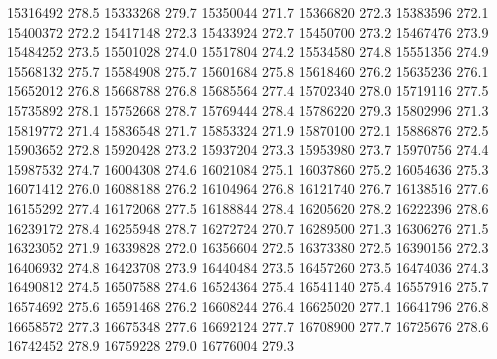 15316492 278.5
15333268 279.7
15350044 271.7
15366820 272.3
15383596 272.1
15400372 272.2
15417148 272.3
15433924 272.7
15450700 273.2
15467476 273.9
15484252 273.5
15501028 274.0
15517804 274.2
15534580 274.8
15551356 274.9
15568132 275.7
15584908 275.7
15601684 275.8
15618460 276.2
15635236 276.1
15652012 276.8
15668788 276.8
15685564 277.4
15702340 278.0
15719116 277.5
15735892 278.1
15752668 278.7
15769444 278.4
15786220 279.3
15802996 271.3
15819772 271.4
15836548 271.7
15853324 271.9
15870100 272.1
15886876 272.5
15903652 272.8
15920428 273.2
15937204 273.3
15953980 273.7
15970756 274.4
15987532 274.7
16004308 274.6
16021084 275.1
16037860 275.2
16054636 275.3
16071412 276.0
16088188 276.2
16104964 276.8
16121740 276.7
16138516 277.6
16155292 277.4
16172068 277.5
16188844 278.4
16205620 278.2
16222396 278.6
16239172 278.4
16255948 278.7
16272724 270.7
16289500 271.3
16306276 271.5
16323052 271.9
16339828 272.0
16356604 272.5
16373380 272.5
16390156 272.3
16406932 274.8
16423708 273.9
16440484 273.5
16457260 273.5
16474036 274.3
16490812 274.5
16507588 274.6
16524364 275.4
16541140 275.4
16557916 275.7
16574692 275.6
16591468 276.2
16608244 276.4
16625020 277.1
16641796 276.8
16658572 277.3
16675348 277.6
16692124 277.7
16708900 277.7
16725676 278.6
16742452 278.9
16759228 279.0
16776004 279.3
